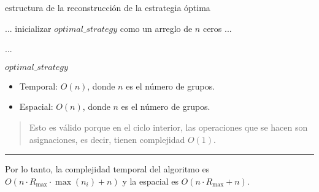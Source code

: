 \begin{algorithm}[H]
	\caption{estructura de la reconstrucción de la estrategia óptima}
	\begin{algorithmic}[1]
		\State ...
		\State inicializar $optimal\_strategy$ como un arreglo de $n$ ceros
		\State ...

			\State ...
		\EndFor

		\State \Return $optimal\_strategy$
	\end{algorithmic}
\end{algorithm}

\begin{itemize}
	\item Temporal: $O(n)$, donde $n$ es el número de grupos.
	\item Espacial: $O(n)$, donde $n$ es el número de grupos.
\end{itemize}

\begin{quote}
	Esto es válido porque en el ciclo interior, las operaciones que se hacen son asignaciones, es decir, tienen complejidad $O(1)$.
\end{quote}

\hrule

Por lo tanto, la complejidad temporal del algoritmo es $O(n \cdot R_{ \max } \cdot \max(n_i) + n)$ y la espacial es $O(n \cdot R_{ \max } + n)$.


